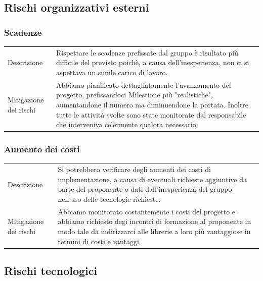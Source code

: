 \documentclass{article}
\begin{document}
\subsection{Rischi organizzativi esterni}
\subsubsection{Scadenze}
\begin{center}
\begin{tabular}{P{10em} P{20em}} 
     Descrizione & Rispettare le scadenze prefissate dal gruppo è risultato più difficile del previsto poichè, a causa dell'inesperienza, non ci si aspettava un simile carico di lavoro. \\ 
    Mitigazione dei rischi &  Abbiamo pianificato dettagliatamente l'avanzamento del progetto, prefissandoci Milestione più "realistiche", aumentandone il numero ma diminuendone la portata. Inoltre tutte le attività svolte sono state monitorate dal responsabile che interveniva celermente qualora necessario.\\
\end{tabular}
\label{tab:mitscadenze}
\end{center}

\subsubsection{Aumento dei costi}
\begin{center}
\begin{tabular}{P{10em} P{20em}} 
     Descrizione &  Si potrebbero verificare degli aumenti dei costi di implementazione, a causa di eventuali richieste aggiuntive da parte del proponente o dati dall'inesperienza del gruppo nell'uso delle tecnologie richieste.\\ 
    Mitigazione dei rischi &  Abbiamo monitorato costantemente i costi del progetto e abbiamo richiesto degi incontri di formazione al proponente in modo tale da indirizzarci alle librerie a loro più vantaggiose in termini di costi e vantaggi.\\
\end{tabular}
\label{tab:mitcosti}
\end{center}


\subsection{Rischi tecnologici}
\end{document}
